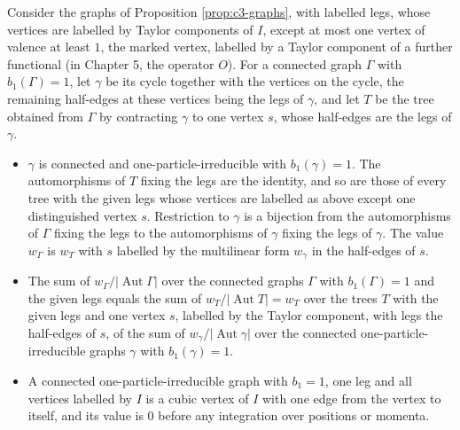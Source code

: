 \begin{lemma}
\label{lem:c4-factor}
Consider the graphs of Proposition \ref{prop:c3-graphs}, with labelled legs, whose vertices are labelled by Taylor components of $I$, except at most one vertex of valence at least $1$, the marked vertex, labelled by a Taylor component of a further functional (in Chapter 5, the operator $O$). For a connected graph $\Gamma$ with $b_1(\Gamma)=1$, let $\gamma$ be its cycle together with the vertices on the cycle, the remaining half-edges at these vertices being the legs of $\gamma$, and let $T$ be the tree obtained from $\Gamma$ by contracting $\gamma$ to one vertex $s$, whose half-edges are the legs of $\gamma$.
\begin{itemize}
\item $\gamma$ is connected and one-particle-irreducible with $b_1(\gamma)=1$. The automorphisms of $T$ fixing the legs are the identity, and so are those of every tree with the given legs whose vertices are labelled as above except one distinguished vertex $s$. Restriction to $\gamma$ is a bijection from the automorphisms of $\Gamma$ fixing the legs to the automorphisms of $\gamma$ fixing the legs of $\gamma$. The value $w_\Gamma$ is $w_T$ with $s$ labelled by the multilinear form $w_\gamma$ in the half-edges of $s$.
\item The sum of $w_\Gamma/|\operatorname{Aut}\Gamma|$ over the connected graphs $\Gamma$ with $b_1(\Gamma)=1$ and the given legs equals the sum of $w_T/|\operatorname{Aut}T|=w_T$ over the trees $T$ with the given legs and one vertex $s$, labelled by the Taylor component, with legs the half-edges of $s$, of the sum of $w_\gamma/|\operatorname{Aut}\gamma|$ over the connected one-particle-irreducible graphs $\gamma$ with $b_1(\gamma)=1$.
\item A connected one-particle-irreducible graph with $b_1=1$, one leg and all vertices labelled by $I$ is a cubic vertex of $I$ with one edge from the vertex to itself, and its value is $0$ before any integration over positions or momenta.
\end{itemize}
\end{lemma}


